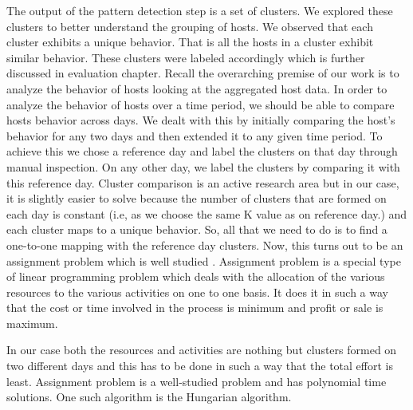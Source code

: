 The output of the pattern detection step is a set of clusters. We explored these clusters to better understand the grouping of hosts. We observed that each cluster exhibits a unique behavior. That is all the hosts in a cluster exhibit similar behavior. These clusters were labeled accordingly which is further discussed in evaluation chapter.
Recall the overarching premise of our work is to analyze the behavior of hosts looking at the aggregated host data. In order to analyze the behavior of hosts over a time period, we should be able to compare hosts behavior across days. We dealt with this by initially comparing the host's behavior for any two days and then extended it to any given time period. To achieve this we chose a reference day and label the clusters on that day through manual inspection. On any other day, we label the clusters by comparing it with this reference day. Cluster comparison is an active research area but in our case, it is slightly easier to solve because the number of clusters that are formed on each day is constant (i.e, as we choose the same K value as on reference day.) and each cluster maps to a unique behavior. So, all that we need to do is to find a one-to-one mapping with the reference day clusters. 
Now, this turns out to be an assignment problem which is well studied \cite{kuhn1955hungarian}. Assignment problem is a special type of linear programming problem which deals with the allocation of the various resources to the various activities on one to one basis. It does it in such a way that the cost or time involved in the process is minimum and profit or sale is maximum. 

In our case both the resources and activities are nothing but clusters formed on two different days and this has to be done in such a way that the total effort is least. Assignment problem is a well-studied problem and has polynomial time solutions. One such algorithm is the Hungarian algorithm\cite{kuhn1955hungarian}.

